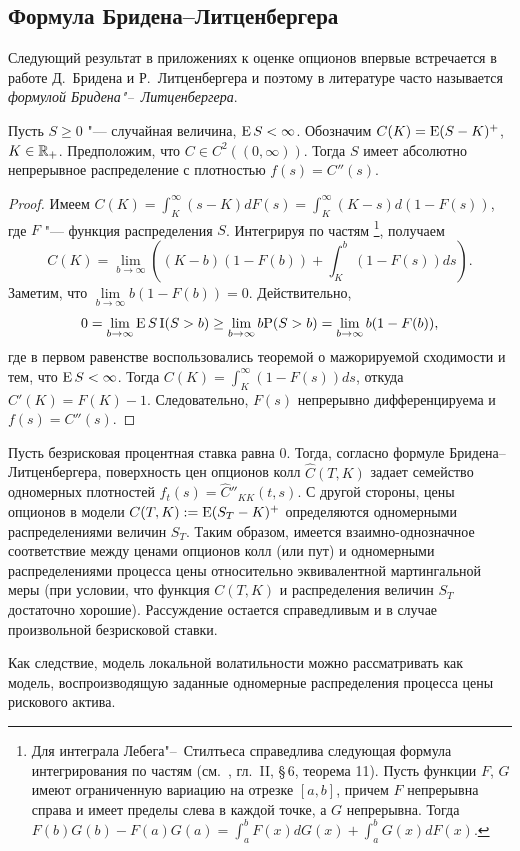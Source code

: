 \subsection{Формула Бридена--Литценбергера}

Следующий результат в приложениях к оценке опционов впервые встречается в работе Д.~Бридена и Р.~Литценбергера \cite{BreedenLitzenberger78} и поэтому в литературе часто называется \emph{формулой Бридена"--~Литценбергера}.

\begin{proposition}
\label{1:l:bl}
Пусть $S\ge 0$ "--- случайная величина, $\operatorname{E} S<\infty$.
Обозначим $C(K) = \operatorname{E}(S-K)^+$, $K\in\mathbb{R}_+$.
Предположим, что $C\in C^2((0,\infty))$.
Тогда $S$ имеет абсолютно непрерывное распределение с плотностью $f(s)=C''(s)$.
\end{proposition}

\begin{proof}
Имеем $C(K) = \int_K^\infty (s-K) d F(s) = \int_K^\infty (K-s) d (1-F(s))$, где $F$ "--- функция распределения $S$.
Интегрируя по частям%
\footnote{Для интеграла Лебега"--~Стилтьеса справедлива следующая формула интегрирования по частям (см.~\cite{Shiryaev04}, гл.~II, \S\,6, теорема 11).
Пусть функции $F$, $G$ имеют ограниченную вариацию на отрезке $[a,b]$, причем $F$ непрерывна справа и имеет пределы слева в каждой точке, а $G$ непрерывна.
Тогда $F(b)G(b) - F(a)G(a) = \int_a^b F(x)d G(x) + \int_a^b G(x) d F(x)$.},
получаем
\[
C(K) = \lim_{b\to\infty} \left((K-b)(1-F(b)) + \int_K^b (1-F(s)) ds\right).
\]
Заметим, что $\lim\limits_{b\to\infty} b(1-F(b)) = 0$. Действительно, 
\[
0 = \lim\limits_{b\to\infty} \operatorname{E} S\operatorname{I}(S> b) \ge \lim_{b\to\infty} b \mathrm{P}(S> b) = \lim\limits_{b\to\infty} b(1-F(b)),
\]
где в первом равенстве воспользовались теоремой о мажорируемой сходимости и тем, что $\operatorname{E} S < \infty$.
Тогда $C(K) = \int_K^\infty (1-F(s)) ds$, откуда $C'(K) = F(K) - 1$.
Следовательно, $F(s)$ непрерывно дифференцируема и $f(s) = C''(s)$.
\end{proof}

\begin{remark}
Пусть безрисковая процентная ставка равна 0.
Тогда, согласно формуле Бридена--Литценбергера, поверхность цен опционов колл $\hat C(T,K)$ задает семейство одномерных плотностей $f_t(s) = \hat C''_{KK}(t,s)$.
С другой стороны, цены опционов в модели $C(T,K) := \operatorname{E}(S_T-K)^+$ определяются одномерными распределениями величин $S_T$.
Таким образом, имеется взаимно-однозначное соответствие между ценами опционов колл (или пут) и одномерными распределениями процесса цены относительно эквивалентной мартингальной меры (при условии, что функция $C(T,K)$ и распределения величин $S_T$ достаточно хорошие). 
Рассуждение остается справедливым и в случае произвольной безрисковой ставки.

Как следствие, модель локальной волатильности можно рассматривать как модель, воспроизводящую заданные одномерные распределения процесса цены рискового актива. 
\end{remark}


